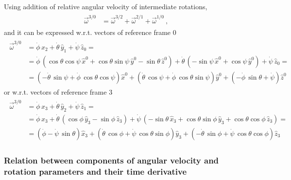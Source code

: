 \documentclass[letterpaper,10pt,english]{jupyterBook}
\begin{document}
\sphinxAtStartPar
Using addition of relative angular velocity of intermediate rotations,
\begin{equation*}
\begin{split}\begin{aligned}
  \vec{\omega}^{3/0} 
  & = \vec{\omega}^{3/2} + \vec{\omega}^{2/1} + \vec{\omega}^{1/0} \ ,
\end{aligned}\end{split}
\end{equation*}
\sphinxAtStartPar
and it can be expressed w.r.t. vectors of reference frame \(0\)
\begin{equation*}
\begin{split}\begin{aligned}
  \vec{\omega}^{3/0} 
  & = \dot{\phi} \, \hat{x}_2 + \dot{\theta} \, \hat{y}_1 + \dot{\psi} \, \hat{z}_0 = \\
  & = \dot{\phi} \, \left( \cos \theta \cos \psi \, \hat{x}^0 + \cos \theta \sin \psi \, \hat{y}^0 - \sin \theta \, \hat{z}^0  \right) + \dot{\theta} \, \left( - \sin \psi \, \hat{x}^0 + \cos \psi \, \hat{y}^0 \right) + \dot{\psi} \, \hat{z}_0 = \\
  & = \left( - \dot{\theta} \, \sin \psi + \dot{\phi} \, \cos \theta \cos \psi \right) \hat{x}^0 + \left( \dot{\theta} \, \cos \psi + \dot{\phi} \, \cos \theta \sin \psi  \right) \hat{y}^0 + \left( - \dot{\phi} \, \sin \theta + \dot{\psi}  \right) \hat{z}^0
\end{aligned}\end{split}
\end{equation*}
\sphinxAtStartPar
or w.r.t. vectors of reference frame \(3\)
\begin{equation*}
\begin{split}\begin{aligned}
  \vec{\omega}^{3/0} 
  & = \dot{\phi} \, \hat{x}_3 + \dot{\theta} \, \hat{y}_2 + \dot{\psi} \, \hat{z}_1 = \\
  & = \dot{\phi} \, \hat{x}_3 + \dot{\theta} \, \left( \cos \phi \, \hat{y}_3 - \sin \phi \, \hat{z}_3 \right) + \dot{\psi} \, \left( - \sin \theta \, \hat{x}_3 + \cos \theta \sin \phi \, \hat{y}_3 + \cos \theta \cos \phi \, \hat{z}_3  \right) = \\
  & = \left( \dot{\phi} - \dot{\psi} \, \sin \theta  \right) \hat{x}_3 + \left(  \dot{\theta} \, \cos \phi + \dot{\psi} \, \cos \theta \sin \phi \right) \hat{y}_3 + \left( - \dot{\theta} \, \sin \phi + \dot{\psi} \, \cos \theta \cos \phi  \right) \hat{z}_3
\end{aligned}\end{split}
\end{equation*}\subsubsection*{Relation between components of angular velocity and rotation parameters and their time derivative}
\end{document}

